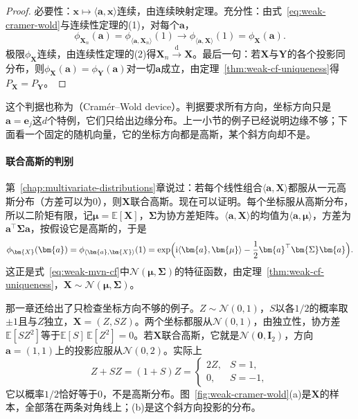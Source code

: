 \begin{proof}
必要性：$\bm{x}\mapsto\langle\bm{a},\bm{x}\rangle$连续，由连续映射定理。充分性：由式~\eqref{eq:weak-cramer-wold}与连续性定理的(1)，对每个$\bm{a}$，
\[
 \phi_{\bm{X}_n}(\bm{a})=\phi_{\langle\bm{a},\bm{X}_n\rangle}(1)\longrightarrow\phi_{\langle\bm{a},\bm{X}\rangle}(1)=\phi_{\bm{X}}(\bm{a}) .
\]
极限$\phi_{\bm{X}}$连续，由连续性定理的(2)得$\bm{X}_n\xrightarrow{\mathrm{d}}\bm{X}$。最后一句：若$\bm{X}$与$\bm{Y}$的各个投影同分布，则$\phi_{\bm{X}}(\bm{a})=\phi_{\bm{Y}}(\bm{a})$对一切$\bm{a}$成立，由定理~\ref{thm:weak-cf-uniqueness}得$P_{\bm{X}}=P_{\bm{Y}}$。
\end{proof}

这个判据也称为（Cramér--Wold device）。判据要求所有方向，坐标方向只是$\bm{a}=\bm{e}_j$这$d$个特例，它们只给出边缘分布。上一小节的例子已经说明边缘不够；下面看一个固定的随机向量，它的坐标方向都是高斯，某个斜方向却不是。

\paragraph{联合高斯的判别}
第~\ref{chap:multivariate-distributions}章说过：若每个线性组合$\langle\bm{a},\bm{X}\rangle$都服从一元高斯分布（方差可以为$0$），则$\bm{X}$联合高斯。现在可以证明。每个坐标服从高斯分布，所以二阶矩有限，记$\bm{\mu}=\mathbb{E}[\bm{X}]$，$\bm{\Sigma}$为协方差矩阵。$\langle\bm{a},\bm{X}\rangle$的均值为$\langle\bm{a},\bm{\mu}\rangle$，方差为$\bm{a}^{\top}\bm{\Sigma}\bm{a}$，按假设它是高斯的，于是
\[
 \phi_{\bm{X}}(\bm{a})=\phi_{\langle\bm{a},\bm{X}\rangle}(1)=\exp\Bigl(\mathrm{i}\langle\bm{a},\bm{\mu}\rangle-\frac12\bm{a}^{\top}\bm{\Sigma}\bm{a}\Bigr) .
\]
这正是式~\eqref{eq:weak-mvn-cf}中$\mathcal{N}(\bm{\mu},\bm{\Sigma})$的特征函数，由定理~\ref{thm:weak-cf-uniqueness}，$\bm{X}\sim\mathcal{N}(\bm{\mu},\bm{\Sigma})$。

那一章还给出了只检查坐标方向不够的例子。$Z\sim\mathcal{N}(0,1)$，$S$以各$1/2$的概率取$\pm1$且与$Z$独立，$\bm{X}=(Z,SZ)$。两个坐标都服从$\mathcal{N}(0,1)$，由独立性，协方差$\mathbb{E}[SZ^{2}]$等于$\mathbb{E}[S]\,\mathbb{E}[Z^{2}]=0$。若$\bm{X}$联合高斯，它就是$\mathcal{N}(\bm{0},\bm{I}_2)$，方向$\bm{a}=(1,1)$上的投影应服从$\mathcal{N}(0,2)$。实际上
\[
 Z+SZ=(1+S)Z=\begin{cases}2Z,&S=1,\\0,&S=-1,\end{cases}
\]
它以概率$1/2$恰好等于$0$，不是高斯分布。图~\ref{fig:weak-cramer-wold}(a)是$\bm{X}$的样本，全部落在两条对角线上；(b)是这个斜方向投影的分布。

